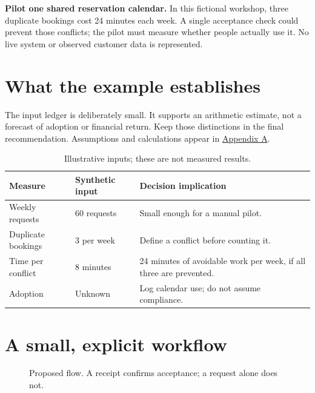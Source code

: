 \documentclass[11pt,letterpaper]{article}
\begin{document}

\textbf{Pilot one shared reservation calendar.} In this fictional workshop,
three duplicate bookings cost 24 minutes each week. A single acceptance
check could prevent those conflicts; the pilot must measure whether people
actually use it. No live system or observed customer data is represented.

\section*{What the example establishes}
The input ledger is deliberately small. It supports an arithmetic estimate,
not a forecast of adoption or financial return. Keep those distinctions in
the final recommendation. Assumptions and calculations appear in
\hyperref[app:inputs]{Appendix A}.

\begin{table}[htbp]
\centering\small
\begin{tabularx}{\linewidth}{@{}lYY@{}}
\toprule
\textbf{Measure} & \textbf{Synthetic input} & \textbf{Decision implication}\\
\midrule
Weekly requests & 60 requests & Small enough for a manual pilot.\\
Duplicate bookings & 3 per week & Define a conflict before counting it.\\
Time per conflict & 8 minutes & 24 minutes of avoidable work per week, if all three are prevented.\\
Adoption & Unknown & Log calendar use; do not assume compliance.\\
\bottomrule
\end{tabularx}
\caption{Illustrative inputs; these are not measured results.}
\end{table}

\section*{A small, explicit workflow}
\begin{figure}[htbp]
\centering
{}
\caption{Proposed flow. A receipt confirms acceptance; a request alone does not.}
\end{figure}
\end{document}
